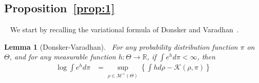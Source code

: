 \documentclass[11pt]{amsart}
\newtheorem{lemma}{Lemma}[section]
\begin{document}
\subsection{\bf Proposition~\ref{prop:1}}~\label{appendix:prop:1}
We start by recalling the variational formula of Donsker and Varadhan~\cite{donsker}.
\begin{lemma}[Donsker-Varadhan]~\label{lem:dv}
For any probability distribution function $\pi$ on $\Theta$, and for any measurable function $h: \Theta \rightarrow \mathbb{R}$, if $\int e^h d\pi <\infty$, then
\begin{align}
    \log\int e^h d\pi & = \underset{\rho\in \mathcal{M}^{+}(\Theta)}{\sup}\left\{\int h d\rho-\mathcal{K}(\rho,\pi) \right\}
\end{align}
\end{lemma}
\end{document}
